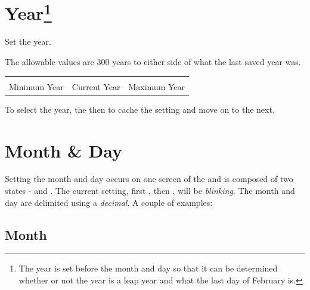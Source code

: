 \section[Year]{Year\footnote{ The year is set before the month and day so
  that it can be determined whether or not the year is a leap year and what the
  last day of February is.}} 

Set the year.

\par\medskip

The allowable values are \num{300} years to either side of what the last saved
year was.

\begin{table}[H]
\centering
{}
\begin{tabu} to 5in {X[1,c,m] X[1,c,m] X[1,c,m]}
   &  &  \\
  \rowfont{\scriptsize} Minimum Year & Current Year & Maximum Year
\end{tabu}
\end{table}

To select the year,  the  then  to cache the setting and
move on to the next.


\section{Month \& Day}

Setting the month and day occurs on one screen of the  and is composed of
two states -  and . The current setting, first , then
, will be \textit{blinking}.  The month and day are delimited using a
\textit{decimal}.  A couple of examples:


\subsection{Month} 

